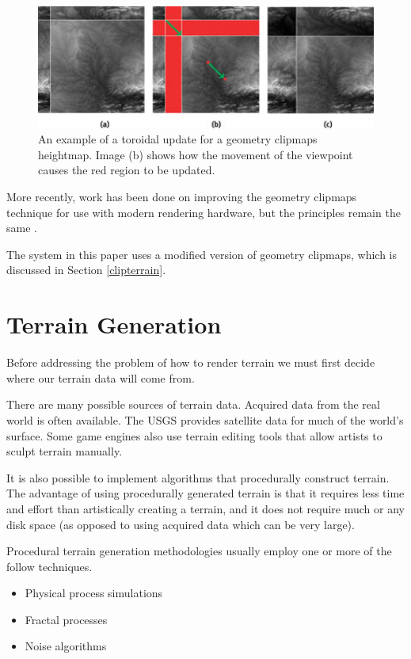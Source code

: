 \begin{figure}
	\centering
		\includegraphics[width=1.0\textwidth]{figures/clipmaps_update.jpg}
	\caption{
		An example of a toroidal update for a geometry clipmaps heightmap.
		Image (b) shows how the movement of the viewpoint causes the red region to be updated.
	}
	\label{fig:clipmaps_update}
\end{figure}

More recently, work has been done on improving the geometry clipmaps technique for use with modern rendering hardware, but the principles remain the same \cite{gems_clipmaps}.

The system in this paper uses a modified version of geometry clipmaps, which is discussed in Section \ref{clipterrain}.

\section{Terrain Generation} \label{terrain_gen}

Before addressing the problem of how to render terrain we must first decide where our terrain data will come from.

There are many possible sources of terrain data.
Acquired data from the real world is often available.
The USGS provides satellite data for much of the world's surface.
Some game engines also use terrain editing tools that allow artists to sculpt terrain manually.

It is also possible to implement algorithms that procedurally construct terrain.
The advantage of using procedurally generated terrain is that it requires less time and effort  than artistically creating a terrain, and it does not require much or any disk space (as opposed to using acquired data which can be very large).

Procedural terrain generation methodologies usually employ one or more of the follow techniques.

\begin{itemize}
\item Physical process simulations
\item Fractal processes
\item Noise algorithms
\end{itemize}

